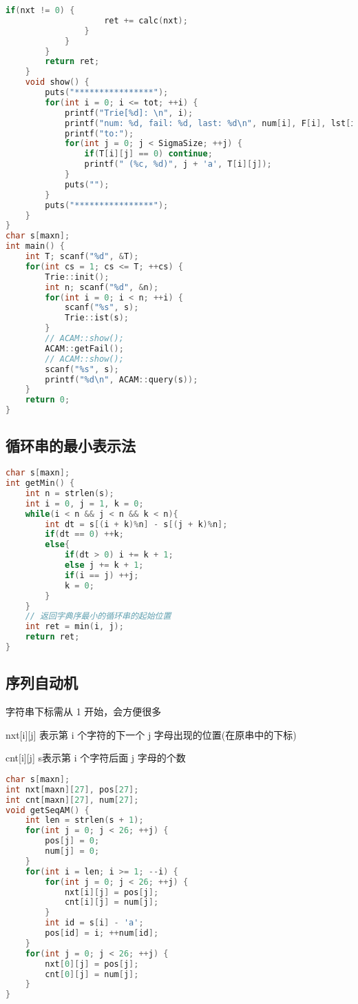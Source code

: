 \begin{lstlisting}[language=C++]
                if(nxt != 0) {
                    ret += calc(nxt);
                }
            }
        }
        return ret;
    }
    void show() {
        puts("****************");
        for(int i = 0; i <= tot; ++i) {
            printf("Trie[%d]: \n", i);
            printf("num: %d, fail: %d, last: %d\n", num[i], F[i], lst[i]);
            printf("to:");
            for(int j = 0; j < SigmaSize; ++j) {
                if(T[i][j] == 0) continue;
                printf(" (%c, %d)", j + 'a', T[i][j]);
            }
            puts("");
        }
        puts("****************");
    }
}
char s[maxn];
int main() {
    int T; scanf("%d", &T);
    for(int cs = 1; cs <= T; ++cs) {
        Trie::init();
        int n; scanf("%d", &n);
        for(int i = 0; i < n; ++i) {
            scanf("%s", s);
            Trie::ist(s);
        }
        // ACAM::show();
        ACAM::getFail();
        // ACAM::show();
        scanf("%s", s);
        printf("%d\n", ACAM::query(s));
    }
    return 0;
}
\end{lstlisting}

\subsection{循环串的最小表示法}

\begin{lstlisting}[language=C++]
char s[maxn];
int getMin() {
    int n = strlen(s);
    int i = 0, j = 1, k = 0;
    while(i < n && j < n && k < n){
        int dt = s[(i + k)%n] - s[(j + k)%n];
        if(dt == 0) ++k;
        else{
            if(dt > 0) i += k + 1;
            else j += k + 1;
            if(i == j) ++j;
            k = 0;
        }
    }
    // 返回字典序最小的循环串的起始位置
    int ret = min(i, j);
    return ret;
}
\end{lstlisting}

\subsection{序列自动机}

字符串下标需从 1 开始，会方便很多

nxt[i][j] 表示第 i 个字符的下一个 j 字母出现的位置(在原串中的下标)

cnt[i][j] s表示第 i 个字符后面 j 字母的个数

\begin{lstlisting}[language=C++]
char s[maxn];
int nxt[maxn][27], pos[27];
int cnt[maxn][27], num[27];
void getSeqAM() {
    int len = strlen(s + 1);
    for(int j = 0; j < 26; ++j) {
        pos[j] = 0;
        num[j] = 0;
    }
    for(int i = len; i >= 1; --i) {
        for(int j = 0; j < 26; ++j) {
            nxt[i][j] = pos[j];
            cnt[i][j] = num[j];
        }
        int id = s[i] - 'a';
        pos[id] = i; ++num[id];
    }
    for(int j = 0; j < 26; ++j) {
        nxt[0][j] = pos[j];
        cnt[0][j] = num[j];
    }
}
\end{lstlisting}

